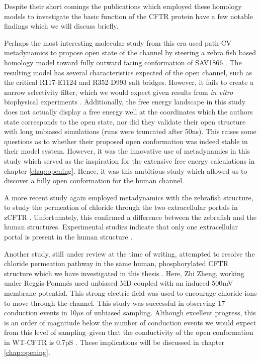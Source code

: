 Despite their short comings the publications which employed these homology models to investigate the basic function of the CFTR protein have a few notable findings which we will discuss briefly. 

Perhaps the most interesting molecular study from this era used path-CV metadynamics to propose open state of the channel by steering a zebra fish based homology model toward fully outward facing conformation of SAV1866 \cite{Hoffmann2018}. The resulting model has several characteristics expected of the open channel, such as the critical R117-E1124 and R352-D993 salt bridges. However, it fails to create a narrow selectivity filter, which we would expect given results from \textit{in vitro} biophysical experiments \cite{linsdell2016, linsdell2017, linsdell2021, li2018b, linsdell2020, negoda2019}. Additionally, the free energy landscape in this study does not actually display a free energy well at the coordinates which the authors state corresponds to the open state, nor did they validate their open structure with long unbiased simulations (runs were truncated after 50ns). This raises some questions as to whether their proposed open conformation was indeed stable in their model system. However, it was the innovative use of metadynamics in this study which served as the inspiration for the extensive free energy calculations in chapter \ref{chap:opening}. Hence, it was this ambitious study which allowed us to discover a fully open conformation for the human channel. 

A more recent study again employed metadynamics with the zebrafish structure, to study the permeation of chloride through the two extracellular portals in zCFTR \cite{farkas2020}. Unfortunately, this confirmed a difference between the zebrafish and the human structures. Experimental studies indicate that only one extracellular portal is present in the human structure \cite{linsdell2018}. 

Another study, still under review at the time of writing, attempted to resolve the chloride permeation pathway in the same human, phosphorylated CFTR structure which we have investigated in this thesis \cite{zeng2021}. Here, Zhi Zheng, working under Reggis Pomm\'es used unbiased MD coupled with an induced 500mV membrane potential. This strong electric field was used to encourage chloride ions to move through the channel. This study was successful in observing 17 conduction events in 10$\mu$s of unbiased sampling. Although excellent progress, this is an order of magnitude below the number of conduction events we would expect from this level of sampling--given that the conductivity of the open conformation in WT-CFTR is 0.7pS \cite{kogan2003,linsdell1998}. These implications will be discussed in chapter \ref{chap:opening}.

